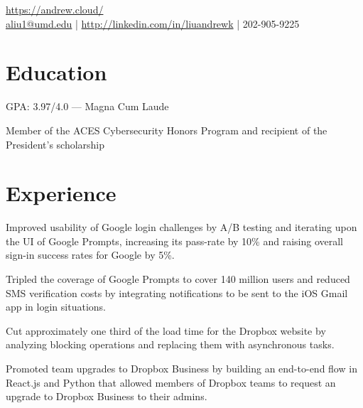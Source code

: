 \documentclass[]{template}
\begin{document}
\lastupdated

{
  \url{https://andrew.cloud/} \\
  \href{mailto:aliu1@umd.edu}{aliu1@umd.edu} | \href{https://linkedin.com/in/liuandrewk}{http://linkedin.com/in/liuandrewk} | 202-905-9225
}

\section{Education}
\begin{tightemize}
\item GPA: 3.97/4.0 --- Magna Cum Laude
\item Member of the ACES Cybersecurity Honors Program and recipient of the President's scholarship
\end{tightemize}
\sectionsep

\section{Experience}

\begin{tightemize}
\item Improved usability of Google login challenges by A/B testing and iterating upon the UI of Google Prompts, increasing its pass-rate by 10\% and raising overall sign-in success rates for Google by 5\%.
\item Tripled the coverage of Google Prompts to cover 140 million users and reduced SMS verification costs by integrating notifications to be sent to the iOS Gmail app in login situations.
\end{tightemize}
\sectionsep

\begin{tightemize}
\item Cut approximately one third of the load time for the Dropbox website by analyzing blocking operations and replacing them with asynchronous tasks.
\item Promoted team upgrades to Dropbox Business by building an end-to-end flow in React.js and Python that allowed members of Dropbox teams to request an upgrade to Dropbox Business to their admins.
\end{tightemize}
\sectionsep
\end{document}
